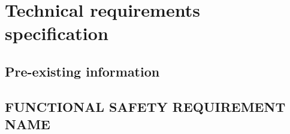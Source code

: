 \section{Technical requirements specification}
%
% 

\subsection{Pre-existing information}
%

\subsection{FUNCTIONAL SAFETY REQUIREMENT NAME}
%
%
%
%
%
%
